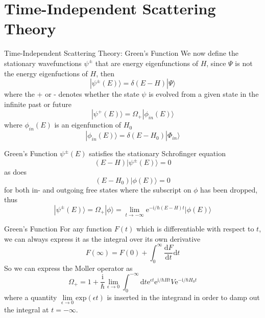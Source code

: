 \documentclass{beamer}
\begin{document}
	\section{Time-Independent Scattering Theory}
	\begin{frame}{Time-Independent Scattering Theory: Green's Function}
		We now define the stationary wavefunctions $\psi^\pm$ that are energy eigenfunctions of $H$, since $\Psi$ is not the energy eigenfuctions of $H$, then
		\begin{equation}
			|\psi^\pm(E)\rangle=\delta(E-H)|\Psi\rangle
		\end{equation}
		where the + or - denotes whether the state $\psi$ is evolved from a given state in the infinite past or future
		\begin{equation}
			|\psi^+(E)\rangle=\Omega_+|\phi_{in}(E)\rangle
		\end{equation}
		where $\phi_{in}(E)$ is an eigenfunction of $H_0 $
		\begin{equation}
			|\phi_{in}(E)\rangle=\delta(E-H_0)|\Phi_{in}\rangle
		\end{equation}
	\end{frame}
	\begin{frame}{Green's Function}
		$\psi^\pm(E)$ satisfies the stationary Schrofinger equation
		\begin{equation}
			(E-H)|\psi^\pm(E)\rangle=0
		\end{equation}
		as does
		\begin{equation}
			(E-H_0)|\phi(E)\rangle=0
		\end{equation}
		for both in- and outgoing free states where the subscript on $\phi$ has been dropped, thus
		\begin{equation}
			|\psi^\pm(E)\rangle=\Omega_+|\phi\rangle=\lim\limits_{t\rightarrow-\infty}\mathrm{e}^{-\mathrm{i}/\hbar(E-H)t}|\phi(E)\rangle
			\label{44}
		\end{equation}
	\end{frame}
	\begin{frame}{Green's Function}
		For any function $F(t)$ which is differentiable with respect to $t$, we can always express it as the integral over its own derivative
		\begin{equation}
			F(\infty)=F(0)+\int_{0}^{\infty}\dfrac{\mathrm{d}F}{\mathrm{d}t}\mathrm{d}t
		\end{equation}
		So we can express the Moller operator as
		\begin{equation}
			\Omega_+=1+\dfrac{\mathrm{i}}{\hbar}\lim\limits_{\epsilon\rightarrow0}\int_0^{-\infty}\mathrm{d}t\mathrm{e}^{\epsilon t}\mathrm{e}^{\mathrm{i}/\hbar Ht}V\mathrm{e}^{-\mathrm{i}/\hbar H_0t}
		\end{equation}
		where a quantity $\lim\limits_{\epsilon\rightarrow0}\mathrm{exp}(\epsilon t)$ is inserted in the integrand in order to damp out the integral at $t=-\infty$.
	\end{frame}
\end{document}
